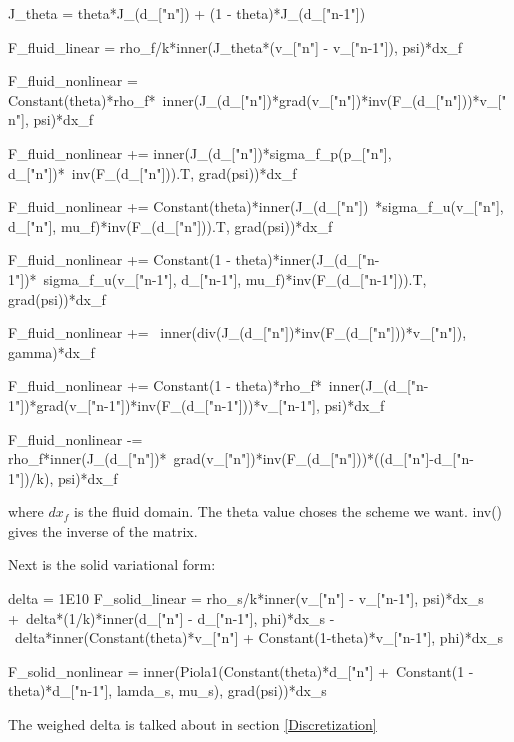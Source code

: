 \begin{python}
J_theta = theta*J_(d_["n"]) + (1 - theta)*J_(d_["n-1"])

F_fluid_linear = rho_f/k*inner(J_theta*(v_["n"] - v_["n-1"]), psi)*dx_f

F_fluid_nonlinear =  Constant(theta)*rho_f*\
inner(J_(d_["n"])*grad(v_["n"])*inv(F_(d_["n"]))*v_["n"], psi)*dx_f

F_fluid_nonlinear += inner(J_(d_["n"])*sigma_f_p(p_["n"], d_["n"])*\
inv(F_(d_["n"])).T, grad(psi))*dx_f

F_fluid_nonlinear += Constant(theta)*inner(J_(d_["n"])\
*sigma_f_u(v_["n"], d_["n"], mu_f)*inv(F_(d_["n"])).T, grad(psi))*dx_f

F_fluid_nonlinear += Constant(1 - theta)*inner(J_(d_["n-1"])*\
sigma_f_u(v_["n-1"], d_["n-1"], mu_f)*inv(F_(d_["n-1"])).T, grad(psi))*dx_f

F_fluid_nonlinear += \
inner(div(J_(d_["n"])*inv(F_(d_["n"]))*v_["n"]), gamma)*dx_f

F_fluid_nonlinear += Constant(1 - theta)*rho_f*\
inner(J_(d_["n-1"])*grad(v_["n-1"])*inv(F_(d_["n-1"]))*v_["n-1"], psi)*dx_f

F_fluid_nonlinear -= rho_f*inner(J_(d_["n"])*\
grad(v_["n"])*inv(F_(d_["n"]))*((d_["n"]-d_["n-1"])/k), psi)*dx_f
\end{python}

where $dx_f$ is the fluid domain. The theta value choses the scheme we want. inv() gives the inverse of the matrix. 


Next is the solid variational form:
\begin{python}
delta = 1E10
F_solid_linear = rho_s/k*inner(v_["n"] - v_["n-1"], psi)*dx_s +\
delta*(1/k)*inner(d_["n"] - d_["n-1"], phi)*dx_s -\
delta*inner(Constant(theta)*v_["n"] + Constant(1-theta)*v_["n-1"], phi)*dx_s

F_solid_nonlinear = inner(Piola1(Constant(theta)*d_["n"] +\
Constant(1 - theta)*d_["n-1"], lamda_s, mu_s), grad(psi))*dx_s
\end{python}

The weighed delta is talked about in section \ref{Discretization}

